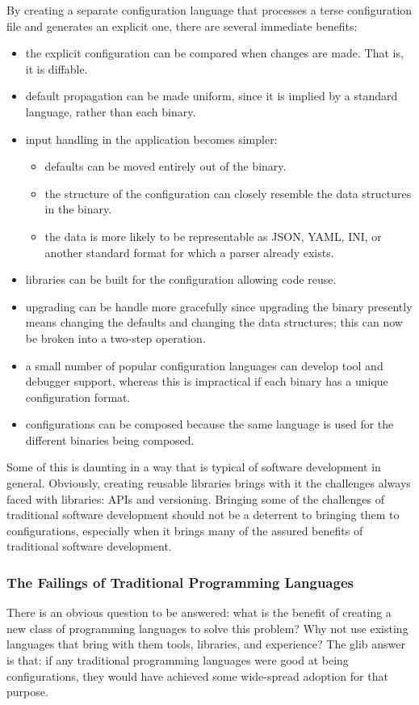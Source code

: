 \documentclass[letterpaper,twocolumn,10pt]{article}
\begin{document}
By creating a separate configuration language that processes a terse configuration file and generates an explicit one, there are several immediate benefits:

\begin{itemize}
\item the explicit configuration can be compared when changes are made. That is, it is diffable.
\item default propagation can be made uniform, since it is implied by a standard language, rather than each binary.
\item input handling in the application becomes simpler:
	\begin{itemize}
	\item defaults can be moved entirely out of the binary.
	\item the structure of the configuration can closely resemble the data structures in the binary.
	\item the data is more likely to be representable as JSON, YAML, INI, or another standard format for which a parser already exists.
  \end{itemize}
\item libraries can be built for the configuration allowing code reuse.
\item upgrading can be handle more gracefully since upgrading the binary presently means changing the defaults and changing the data structures; this can now be broken into a two-step operation.
\item a small number of popular configuration languages can develop tool and debugger support, whereas this is impractical if each binary has a unique configuration format.
\item configurations can be composed because the same language is used for the different binaries being composed.
\end{itemize}

Some of this is daunting in a way that is typical of software development in general. Obviously, creating reusable libraries brings with it the challenges always faced with libraries: APIs and versioning. Bringing some of the challenges of traditional software development should not be a deterrent to bringing them to configurations, especially when it brings many of the assured benefits of traditional software development.

\subsubsection{The Failings of Traditional Programming Languages}
There is an obvious question to be answered: what is the benefit of creating a new class of programming languages to solve this problem? Why not use existing languages that bring with them tools, libraries, and experience? The glib answer is that: if any traditional programming languages were good at being configurations, they would have achieved some wide-spread adoption for that purpose.
\end{document}
